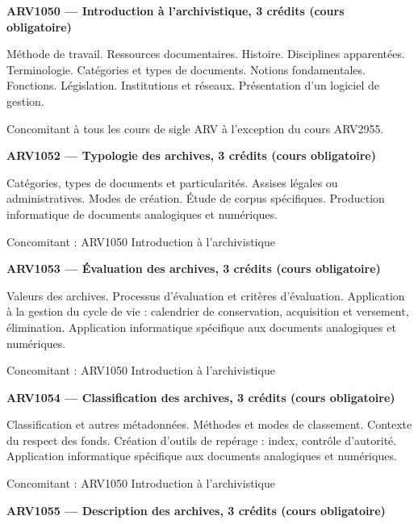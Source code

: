 \documentclass [12 pt]{article}
\begin{document}
        \textbf{
        ARV1050 — Introduction à l'archivistique, 3 crédits (cours obligatoire)
        }
    
            Méthode de travail. Ressources documentaires. Histoire. Disciplines apparentées.
                Terminologie. Catégories et types de documents. Notions fondamentales. Fonctions.
                Législation. Institutions et réseaux. Présentation d'un logiciel de gestion.
            
                Concomitant à tous les cours de sigle ARV à l'exception du cours ARV2955.
            
            
        \textbf{
        ARV1052 — Typologie des archives, 3 crédits (cours obligatoire)
        }
    
            Catégories, types de documents et particularités. Assises légales ou administratives.
                Modes de création. Étude de corpus spécifiques. Production informatique de documents
                analogiques et numériques.
            
                Concomitant : ARV1050 Introduction à l'archivistique
            
            
        \textbf{
        ARV1053 — Évaluation des archives, 3 crédits (cours obligatoire)
        }
    
            Valeurs des archives. Processus d'évaluation et critères d'évaluation. Application à
                la gestion du cycle de vie : calendrier de conservation, acquisition et versement,
                élimination. Application informatique spécifique aux documents analogiques et
                numériques.
            
                Concomitant : ARV1050 Introduction à l'archivistique
            
            
        \textbf{
        ARV1054 — Classification des archives, 3 crédits (cours obligatoire)
        }
    
            Classification et autres métadonnées. Méthodes et modes de classement. Contexte du
                respect des fonds. Création d'outils de repérage : index, contrôle d'autorité.
                Application informatique spécifique aux documents analogiques et numériques.
            
                Concomitant : ARV1050 Introduction à l'archivistique
            
            
        \textbf{
        ARV1055 — Description des archives, 3 crédits (cours obligatoire)
        }
    
\end{document}

